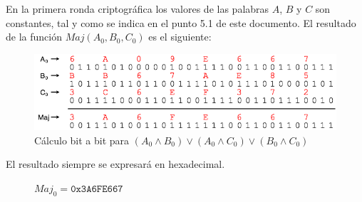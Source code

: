 \documentclass{article}
\begin{document}
        \vspace{3mm}
        En la primera ronda criptográfica los valores de las palabras $A$, $B$ y $C$ son constantes, tal y como se indica en el punto 5.1 de este documento. El resultado de la función $Maj(A_{0}, B_{0}, C_{0})$ es el siguiente:
            \begin{figure}[H]
            \centering
                \includegraphics[scale=0.41]{img/SHA-256-function_Maj.png}
                \caption{Cálculo bit a bit para $(A_{0} \land B_{0}) \lor (A_{0} \land C_{0}) \lor (B_{0} \land C_{0})$}
            \end{figure}
        El resultado siempre se expresará en hexadecimal.
            \begin{figure}[H]
            \centering
                $Maj_{0} = \texttt{0x3A6FE667}$
            \end{figure}
        
\end{document}
